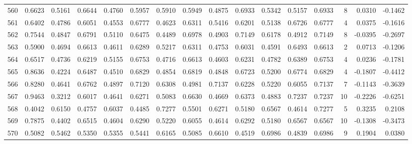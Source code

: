 \begin{tabular}{lrrrrrrrrrrrrrrr}
560 &      0.6623 &  0.5161 &  0.6644 &  0.4760 &  0.5957 &  0.5910 &  0.5949 &  0.4875 &  0.6933 &  0.5342 &   0.5157 &     0.6933 &      8 &                    0.0310 &                    -0.1462 \\
561 &      0.6402 &  0.4786 &  0.6051 &  0.4553 &  0.6777 &  0.4623 &  0.6311 &  0.5416 &  0.6201 &  0.5138 &   0.6726 &     0.6777 &      4 &                    0.0375 &                    -0.1616 \\
562 &      0.7544 &  0.4847 &  0.6791 &  0.5110 &  0.6475 &  0.4489 &  0.6978 &  0.4903 &  0.7149 &  0.6178 &   0.4912 &     0.7149 &      8 &                   -0.0395 &                    -0.2697 \\
563 &      0.5900 &  0.4694 &  0.6613 &  0.4611 &  0.6289 &  0.5217 &  0.6311 &  0.4753 &  0.6031 &  0.4591 &   0.6493 &     0.6613 &      2 &                    0.0713 &                    -0.1206 \\
564 &      0.6517 &  0.4736 &  0.6219 &  0.5155 &  0.6753 &  0.4716 &  0.6613 &  0.4603 &  0.6231 &  0.4782 &   0.6389 &     0.6753 &      4 &                    0.0236 &                    -0.1781 \\
565 &      0.8636 &  0.4224 &  0.6487 &  0.4510 &  0.6829 &  0.4854 &  0.6819 &  0.4848 &  0.6723 &  0.5200 &   0.6774 &     0.6829 &      4 &                   -0.1807 &                    -0.4412 \\
566 &      0.8280 &  0.4641 &  0.6762 &  0.4897 &  0.7120 &  0.6308 &  0.4981 &  0.7137 &  0.6228 &  0.5220 &   0.6055 &     0.7137 &      7 &                   -0.1143 &                    -0.3639 \\
567 &      0.9463 &  0.3212 &  0.6017 &  0.4641 &  0.6271 &  0.5083 &  0.6630 &  0.4669 &  0.6373 &  0.4883 &   0.7237 &     0.7237 &     10 &                   -0.2226 &                    -0.6251 \\
568 &      0.4042 &  0.6150 &  0.4757 &  0.6037 &  0.4485 &  0.7277 &  0.5501 &  0.6271 &  0.5180 &  0.6567 &   0.4614 &     0.7277 &      5 &                    0.3235 &                     0.2108 \\
569 &      0.7875 &  0.4402 &  0.6515 &  0.4604 &  0.6290 &  0.5220 &  0.6055 &  0.4614 &  0.6292 &  0.5180 &   0.6567 &     0.6567 &     10 &                   -0.1308 &                    -0.3473 \\
570 &      0.5082 &  0.5462 &  0.5350 &  0.5355 &  0.5441 &  0.6165 &  0.5085 &  0.6610 &  0.4519 &  0.6986 &   0.4839 &     0.6986 &      9 &                    0.1904 &                     0.0380 \\

\end{tabular}

